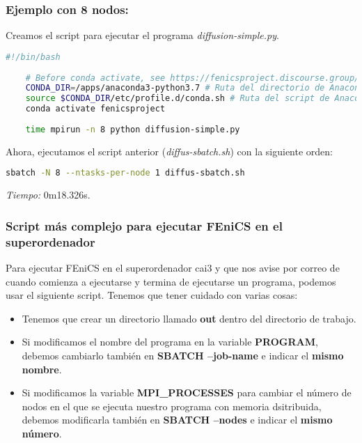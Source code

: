 \subsubsection*{Ejemplo con 8 nodos:}
Creamos el script para ejecutar el programa \textit{diffusion-simple.py}.
\begin{lstlisting}[language=sh]
	#!/bin/bash
	
	# Before conda activate, see https://fenicsproject.discourse.group/t/fenics-from-conda-doesnt-import/3502/6
	CONDA_DIR=/apps/anaconda3-python3.7 # Ruta del directorio de Anaconda
	source $CONDA_DIR/etc/profile.d/conda.sh # Ruta del script de Anaconda
	conda activate fenicsproject
	
	time mpirun -n 8 python diffusion-simple.py
\end{lstlisting}

Ahora, ejecutamos el script anterior (\textit{diffus-sbatch.sh}) con la siguiente orden:
\begin{lstlisting}[language=sh]
	sbatch -N 8 --ntasks-per-node 1 diffus-sbatch.sh
\end{lstlisting}

\textit{Tiempo:} 0m18.326s.

\subsubsection*{Script más complejo para ejecutar FEniCS en el superordenador}
Para ejecutar FEniCS en el superordenador cai3 y que nos avise por correo de cuando comienza a ejecutarse y termina de ejecutarse un programa, podemos usar el siguiente script. Tenemos que tener cuidado con varias cosas:
\begin{itemize}
	\item Tenemos que crear un directorio llamado \textbf{out} dentro del directorio de trabajo.
	\item Si modificamos el nombre del programa en la variable \textbf{PROGRAM}, debemos cambiarlo también en \textbf{SBATCH --job-name} e indicar el \textbf{mismo nombre}.
	\item Si modificamos la variable \textbf{MPI\_PROCESSES} para cambiar el número de nodos en el que se ejecuta nuestro programa con memoria dsitribuida, debemos modificarla también en \textbf{SBATCH --nodes} e indicar el \textbf{mismo número}.
\end{itemize}

